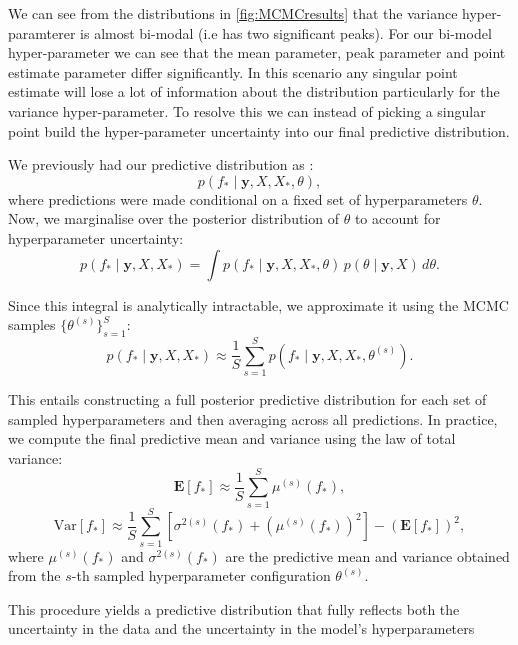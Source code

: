 \documentclass{article}
\begin{document}
\noindent
We can see from the distributions in \ref{fig:MCMCresults} that the variance hyper-paramterer is almost bi-modal (i.e has two significant peaks). For our bi-model hyper-parameter we can see that the mean parameter, peak parameter and point estimate parameter differ significantly.
In this scenario any singular point estimate will lose a lot of information about the distribution particularly for the variance hyper-parameter. To resolve this we can instead of picking a singular point build
the hyper-parameter uncertainty into our final predictive distribution.


\noindent
We previously had our predictive distribution as :
\[
p(f_* \mid \mathbf{y}, X, X_*, \theta),
\]
where predictions were made conditional on a fixed set of hyperparameters \( \theta \). Now, we marginalise over the posterior distribution of \( \theta \) to account for hyperparameter uncertainty:
\[
p(f_* \mid \mathbf{y}, X, X_*) = \int p(f_* \mid \mathbf{y}, X, X_*, \theta) \, p(\theta \mid \mathbf{y}, X) \, d\theta.
\]

\noindent
Since this integral is analytically intractable, we approximate it using the MCMC samples \( \{\theta^{(s)}\}_{s=1}^S \):
\[
p(f_* \mid \mathbf{y}, X, X_*) \approx \frac{1}{S} \sum_{s=1}^{S} p(f_* \mid \mathbf{y}, X, X_*, \theta^{(s)}).
\]

\noindent
This entails constructing a full posterior predictive distribution for each set of sampled hyperparameters and then averaging across all predictions. In practice, we compute the final predictive mean and variance using the law of total variance:
\[
\mathbf{E}[f_*] \approx \frac{1}{S} \sum_{s=1}^{S} \mu^{(s)}(f_*),
\]
\[
\text{Var}[f_*] \approx \frac{1}{S} \sum_{s=1}^{S} \left[ \sigma^{2(s)}(f_*) + \left(\mu^{(s)}(f_*)\right)^2 \right] - \left( \mathbf{E}[f_*] \right)^2,
\]
where \( \mu^{(s)}(f_*) \) and \( \sigma^{2(s)}(f_*) \) are the predictive mean and variance obtained from the \( s \)-th sampled hyperparameter configuration \( \theta^{(s)} \).


\noindent
This procedure yields a predictive distribution that fully reflects both the uncertainty in the data and the uncertainty in the model's hyperparameters
\end{document}
